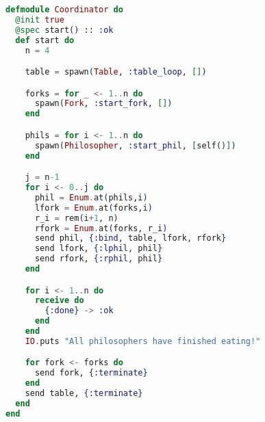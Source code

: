 \begin{lstlisting}[language=Elixir, xleftmargin=.1\linewidth]
defmodule Coordinator do
  @init true
  @spec start() :: :ok
  def start do
    n = 4

    table = spawn(Table, :table_loop, [])

    forks = for _ <- 1..n do
      spawn(Fork, :start_fork, [])
    end

    phils = for i <- 1..n do
      spawn(Philosopher, :start_phil, [self()])
    end

    j = n-1
    for i <- 0..j do
      phil = Enum.at(phils,i)
      lfork = Enum.at(forks,i)
      r_i = rem(i+1, n)
      rfork = Enum.at(forks, r_i)
      send phil, {:bind, table, lfork, rfork}
      send lfork, {:lphil, phil}
      send rfork, {:rphil, phil}
    end

    for i <- 1..n do
      receive do
        {:done} -> :ok
      end
    end
    IO.puts "All philosophers have finished eating!"

    for fork <- forks do
      send fork, {:terminate}
    end
    send table, {:terminate}
  end
end

\end{lstlisting}

